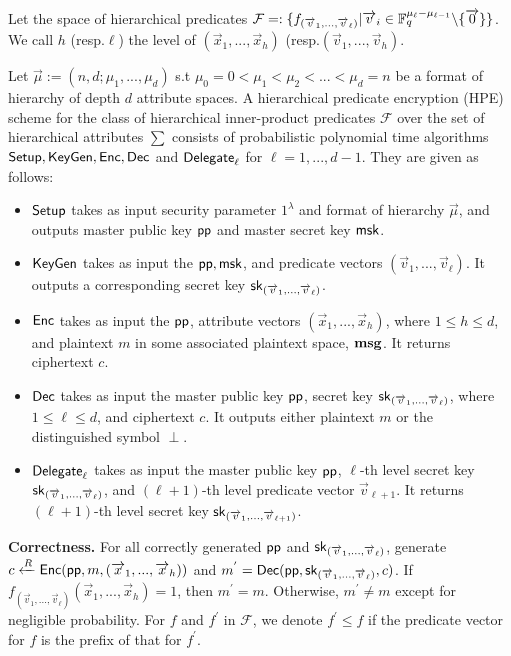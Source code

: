 \documentclass{llncs}
\begin{document}
\begin{appendix}
Let the space of hierarchical predicates $\mathcal{F}=:\{f_{(\overrightarrow{v}_{1},...,\overrightarrow{v}_{\ell})}|\overrightarrow{v}_{i} \in \mathbb{F}^{\mu_{\ell}-\mu_{\ell-1}}_{q}\backslash \{\overrightarrow{0}\}\}$. We call $h$ (resp.$\ell$) the level of $(\overrightarrow{x}_{1},...,\overrightarrow{x}_{h})$ (resp.$(\overrightarrow{v}_{1},...,\overrightarrow{v}_{h})$.
\begin{definition}
Let $\overrightarrow{\mu}:=(n,d;\mu_{1},...,\mu_{d})$ s.t $\mu_{0}=0<\mu_{1}<\mu_{2}<...<\mu_{d}=n$ be a format of hierarchy of depth $d$ attribute spaces. A hierarchical predicate encryption (HPE) scheme for the class of hierarchical inner-product predicates $\mathcal{F}$ over the set of hierarchical attributes $\sum$ consists of probabilistic polynomial time algorithms $\mathsf{Setup}, \mathsf{KeyGen}, \mathsf{Enc}, \mathsf{Dec}$ and $\mathsf{Delegate}_{\ell}$ for $\ell=1,...,d-1$. They are given as follows:
\begin{itemize}
\item $\mathsf{Setup}$ takes as input security parameter $1^{\lambda}$ and format of hierarchy $\overrightarrow{\mu}$, and outputs master public key $\mathsf{pp}$ and master secret key $\mathsf{msk}$.
\item $\mathsf{KeyGen}$ takes as input the $\mathsf{pp}, \mathsf{msk}$, and predicate vectors $(\overrightarrow{v}_{1},...,\overrightarrow{v}_{\ell})$. It outputs a corresponding secret key $\mathsf{sk}_{(\overrightarrow{v}_{1},...,\overrightarrow{v}_{\ell})}$.
\item $\mathsf{Enc}$ takes as input the $\mathsf{pp}$, attribute vectors $(\overrightarrow{x}_{1},...,\overrightarrow{x}_{h})$, where $1\leq h \leq d$, and plaintext $m$ in some associated plaintext space, $\mathbf{msg}$. It returns ciphertext $c$.
\item $\mathsf{Dec}$ takes as input the master public key $\mathsf{pp}$, secret key $\mathsf{sk}_{(\overrightarrow{v}_{1},...,\overrightarrow{v}_{\ell})}$, where $1\leq \ell \leq d$, and ciphertext $c$. It outputs either plaintext $m$ or the distinguished symbol $\perp$.
\item $\mathsf{Delegate}_{\ell}$ takes as input the master public key $\mathsf{pp}$, $\ell$-th level secret key $\mathsf{sk}_{(\overrightarrow{v}_{1},...,\overrightarrow{v}_{\ell})}$, and $(\ell+1)$-th level predicate vector $\overrightarrow{v}_{\ell+1}$. It returns $(\ell+1)$-th level secret key $\mathsf{sk}_{(\overrightarrow{v}_{1},...,\overrightarrow{v}_{\ell+1})}$.
\end{itemize}
\end{definition}
\textbf{Correctness.} For all correctly generated $\mathsf{pp}$ and $\mathsf{sk}_{(\overrightarrow{v}_{1},...,\overrightarrow{v}_{\ell})}$, generate $c \xleftarrow{R} \mathsf{Enc}(\mathsf{pp}, m,\\ (\overrightarrow{x}_{1},...,\overrightarrow{x}_{h}))$ and $m^{'}= \mathsf{Dec}(\mathsf{pp}, \mathsf{sk}_{(\overrightarrow{v}_{1},...,\overrightarrow{v}_{\ell})}, c)$. If $f_{(\overrightarrow{v}_{1},...,\overrightarrow{v}_{\ell})}(\overrightarrow{x}_{1},...,\overrightarrow{x}_{h})=1$, then $m^{'}=m$. Otherwise, $m^{'}\neq m$ except for negligible probability. For $f$ and $f^{'}$ in $\mathcal{F}$, we denote $f^{'}\leq f$ if the predicate vector for $f$ is the prefix of that for $f^{'}$.\\

\end{appendix}
\end{document}
